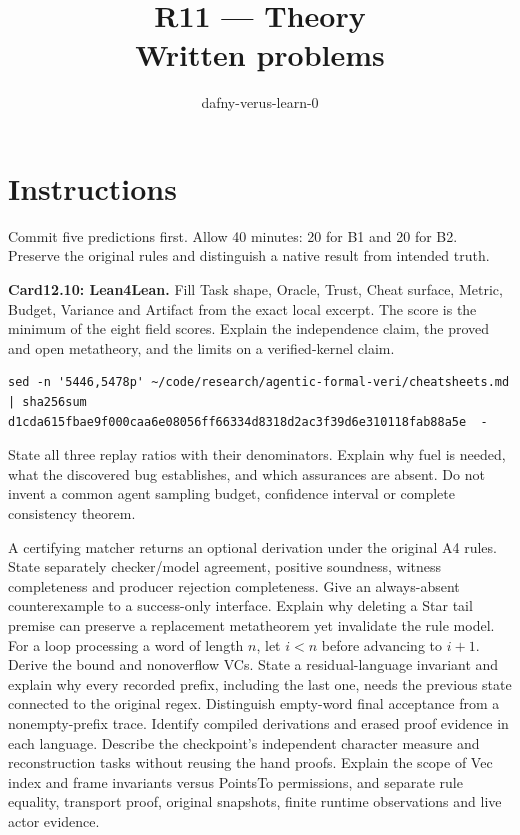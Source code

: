 \documentclass[11pt]{article}
\title{R11 --- Theory \\ \large Written problems}
\author{dafny-verus-learn-0}
\date{}
\begin{document}
\maketitle
\section*{Instructions}
Commit five predictions first. Allow 40 minutes: 20 for B1 and 20 for B2.
Preserve the original rules and distinguish a native result from intended truth.
\begin{problem}\label{prob:B1}
\textbf{Card12.10: Lean4Lean.} Fill Task shape, Oracle, Trust, Cheat surface,
Metric, Budget, Variance and Artifact from the exact local excerpt. The score
is the minimum of the eight field scores. Explain the independence claim,
the proved and open metatheory, and the limits on a verified-kernel claim.
\begin{verbatim}
sed -n '5446,5478p' ~/code/research/agentic-formal-veri/cheatsheets.md | sha256sum
d1cda615fbae9f000caa6e08056ff66334d8318d2ac3f39d6e310118fab88a5e  -
\end{verbatim}
State all three replay ratios with their denominators. Explain why fuel is
needed, what the discovered bug establishes, and which assurances are absent.
Do not invent a common agent sampling budget, confidence interval or complete
consistency theorem.
\end{problem}
\begin{problem}[proof]\label{prob:B2}
A certifying matcher returns an optional derivation under the original A4
rules. State separately checker/model agreement, positive soundness, witness
completeness and producer rejection completeness. Give an always-absent
counterexample to a success-only interface. Explain why deleting a Star tail
premise can preserve a replacement metatheorem yet invalidate the rule model.
For a loop processing a word of length $n$, let $i<n$ before advancing to $i+1$.
Derive the bound and nonoverflow VCs. State a residual-language invariant and
explain why every recorded prefix, including the last one, needs the previous
state connected to the original regex. Distinguish empty-word final acceptance
from a nonempty-prefix trace. Identify compiled derivations and erased proof
evidence in each language. Describe the checkpoint's independent character
measure and reconstruction tasks without reusing the hand proofs.
Explain the scope of Vec index and frame invariants versus PointsTo permissions,
and separate rule equality, transport proof, original snapshots, finite runtime
observations and live actor evidence.
\end{problem}
\end{document}
